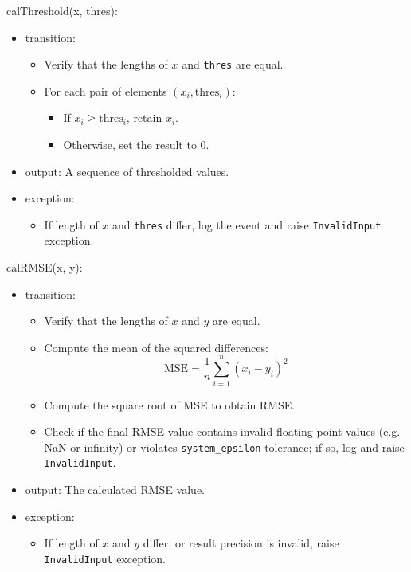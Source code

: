 \documentclass[12pt, titlepage]{article}
\begin{document}
\noindent calThreshold(x, thres):
\begin{itemize}
\item transition:
    \begin{itemize}
    \item Verify that the lengths of $x$ and \texttt{thres} are equal.
    \item For each pair of elements $(x_i, \text{thres}_i)$:
        \begin{itemize}
        \item If $x_i \geq \text{thres}_i$, retain $x_i$.
        \item Otherwise, set the result to 0.
        \end{itemize}
    \end{itemize}
\item output: A sequence of thresholded values.
\item exception:
    \begin{itemize}
    \item If length of $x$ and \texttt{thres} differ, log the event and raise
    \texttt{InvalidInput} exception.
    \end{itemize}
\end{itemize}

\noindent calRMSE(x, y):
\begin{itemize}
\item transition:
    \begin{itemize}
    \item Verify that the lengths of $x$ and $y$ are equal.
    \item Compute the mean of the squared differences:
        \[
        \text{MSE} = \frac{1}{n} \sum_{i=1}^{n} (x_i - y_i)^2
        \]
    \item Compute the square root of MSE to obtain RMSE.
    \item Check if the final RMSE value contains invalid floating-point values
    (e.g. NaN or infinity) or violates \texttt{system\_epsilon} tolerance; if
    so, log and raise \texttt{InvalidInput}.
    \end{itemize}
\item output: The calculated RMSE value.
\item exception:
    \begin{itemize}
    \item If length of $x$ and $y$ differ, or result precision is invalid, raise
    \texttt{InvalidInput} exception.
    \end{itemize}
\end{itemize}
\end{document}
